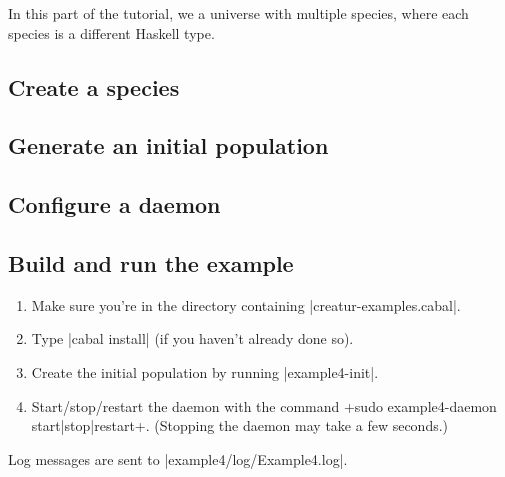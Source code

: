 \documentclass[a4paper,10pt]{report}
\begin{document}
In this part of the tutorial, we a universe with multiple species,
where each species is a different Haskell type.

\subsection{Create a species}
\label{sec:species4}





\subsection{Generate an initial population}
\label{sec:pop4}



\subsection{Configure a daemon}
\label{sec:daemon4}



\subsection{Build and run the example}
\label{sec:run4}

\begin{enumerate}
\item Make sure you're in the directory containing |creatur-examples.cabal|.
\item Type |cabal install| (if you haven't already done so).
\item Create the initial population by running |example4-init|.
\item Start/stop/restart the daemon with the command
\UndefineShortVerb{\|}
\DefineShortVerb{\+}
+sudo example4-daemon start|stop|restart+.
\UndefineShortVerb{\+}
\DefineShortVerb{\|}
(Stopping the daemon may take a few seconds.)
\end{enumerate}

Log messages are sent to |example4/log/Example4.log|.
\end{document}
